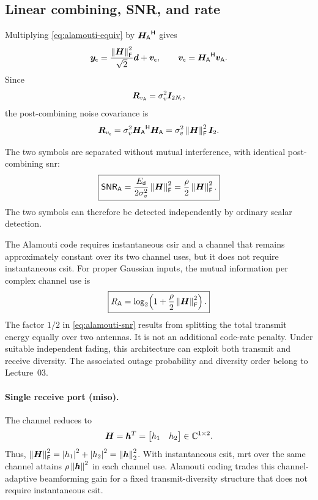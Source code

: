 \subsection{Linear combining, SNR, and rate}

Multiplying \eqref{eq:alamouti-equiv} by
${\bm{H}_{\mathsf A}}^{\mathsf{H}}$ gives
\begin{equation*}
	\bm{y}_{\mathsf c}
	=\frac{\left\|\bm{H}\right\|_{\mathsf{F}}^2}{\sqrt{2}}\bm{d}
	+\bm{v}_{\mathsf c},
	\qquad
	\bm{v}_{\mathsf c}
	={\bm{H}_{\mathsf A}}^{\mathsf{H}}\bm{v}_{\mathsf A}.
\end{equation*}
Since
\begin{equation*}
	\bm{R}_{v_{\mathsf A}}
	=\sigma_v^2\bm{I}_{2N_{\mathsf{r}}},
\end{equation*}
the post-combining noise covariance is
\begin{equation*}
	\bm{R}_{v_{\mathsf c}}
	=\sigma_v^2
	{\bm{H}_{\mathsf A}}^{\mathsf{H}}\bm{H}_{\mathsf A}
	=\sigma_v^2\left\|\bm{H}\right\|_{\mathsf{F}}^2\bm{I}_2.
\end{equation*}

The two symbols are separated without mutual interference,
with identical post-combining \ac{snr}:
\begin{equation}\label{eq:alamouti-snr}
	\boxed{
		\mathsf{SNR}_{\mathsf A}
		=\frac{E_{\mathsf{d}}}{2\sigma_v^2}\left\|\bm{H}\right\|_{\mathsf{F}}^2
		=\frac{\rho}{2}\left\|\bm{H}\right\|_{\mathsf{F}}^2.
	}
\end{equation}
The two symbols can therefore be detected independently by ordinary scalar detection.

The Alamouti code requires instantaneous \ac{csir} and a channel that remains approximately constant over its two channel uses, but it does not require instantaneous \ac{csit}. For proper Gaussian inputs, the mutual information per complex channel use is
\begin{equation}\label{eq:alamouti-rate}
	\boxed{
		R_{\mathsf A}
		=
		\log_2\!\left(1+\frac{\rho}{2}\left\|\bm{H}\right\|_{\mathsf{F}}^2\right).}
\end{equation}
The factor \(1/2\) in \eqref{eq:alamouti-snr} results from splitting the total transmit energy equally over two antennas. It is not an additional code-rate penalty.
Under suitable independent fading, this architecture can exploit both transmit and receive diversity. The associated outage probability and diversity order belong to Lecture~03.
\paragraph{Single receive port (\acs{miso}).}
The channel reduces to
\begin{equation*}
	\bm{H} = \bm{h}^T = \begin{bmatrix}{h}_1 & {h}_2\end{bmatrix}\in\mathbb{C}^{1\times 2}.
\end{equation*}
Thus, $\left\|\bm{H}\right\|_{\mathsf{F}}^2 = \left|h_1\right|^2+\left|h_2\right|^2 = \left\|\bm{h}\right\|_2^2$. 
With instantaneous \ac{csit}, \ac{mrt} over the same channel attains $\rho \left\|\bm{h}\right\|^2$ in each channel use. Alamouti coding trades this channel-adaptive beamforming gain for a fixed transmit-diversity structure that does not require instantaneous \ac{csit}.

